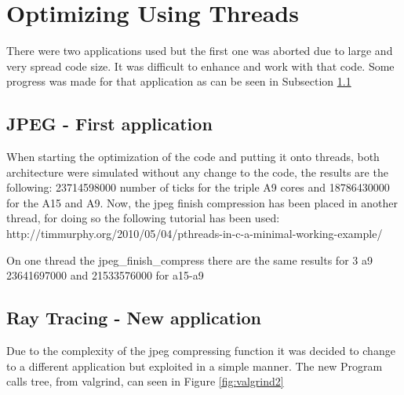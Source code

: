 \documentclass[journal]{IEEEtran}
\begin{document}
\section{Optimizing Using Threads}

There were two applications used but the first one was aborted due to large and very spread code size. It was difficult to enhance and work with that code. Some progress was made for that application as can be seen in Subsection \ref{sec:jpeg}

\subsection{JPEG - First application}
\label{sec:jpeg}
When starting the optimization of the code and putting it onto threads, both architecture were simulated without any change to the code, the results are the following:
23714598000 number of ticks for the triple A9 cores and 18786430000 for the A15 and A9. 
Now, the jpeg finish compression has been placed in another thread, for doing so the following tutorial has been used: http://timmurphy.org/2010/05/04/pthreads-in-c-a-minimal-working-example/

On one thread the jpeg\_finish\_compress there are the same results for 3 a9 23641697000 and 21533576000 for a15-a9


\subsection{Ray Tracing - New application }
Due to the complexity of the jpeg compressing function it was decided to change to a different application but exploited in a simple manner. The new Program calls tree, from valgrind, can seen in Figure \ref{fig:valgrind2}
\end{document}
